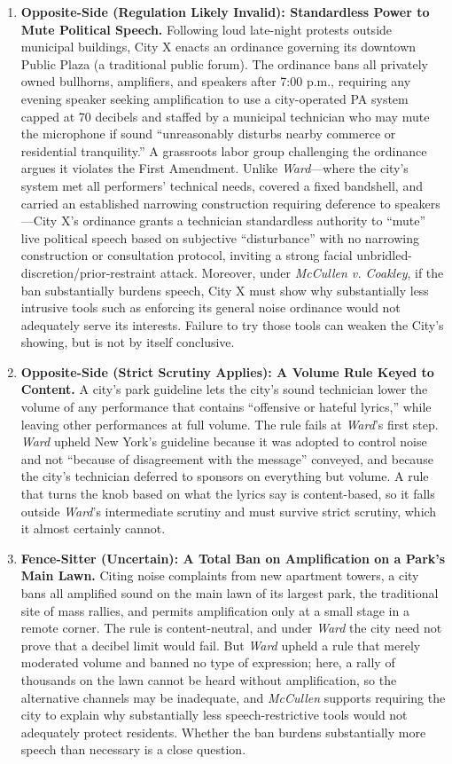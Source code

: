 \documentclass[12pt]{article}
\begin{document}
\begin{enumerate}
\item \textbf{Opposite-Side (Regulation Likely Invalid): Standardless Power to Mute Political Speech.} Following loud late-night protests outside municipal buildings, City X enacts an ordinance governing its downtown Public Plaza (a traditional public forum). The ordinance bans all privately owned bullhorns, amplifiers, and speakers after 7:00 p.m., requiring any evening speaker seeking amplification to use a city-operated PA system capped at 70 decibels and staffed by a municipal technician who may mute the microphone if sound ``unreasonably disturbs nearby commerce or residential tranquility.'' A grassroots labor group challenging the ordinance argues it violates the First Amendment. Unlike \textit{Ward}---where the city's system met all performers' technical needs, covered a fixed bandshell, and carried an established narrowing construction requiring deference to speakers---City X's ordinance grants a technician standardless authority to ``mute'' live political speech based on subjective ``disturbance'' with no narrowing construction or consultation protocol, inviting a strong facial unbridled-discretion/prior-restraint attack. Moreover, under \textit{McCullen v. Coakley}, if the ban substantially burdens speech, City X must show why substantially less intrusive tools such as enforcing its general noise ordinance would not adequately serve its interests. Failure to try those tools can weaken the City's showing, but is not by itself conclusive.

\item \textbf{Opposite-Side (Strict Scrutiny Applies): A Volume Rule Keyed to Content.} A city's park guideline lets the city's sound technician lower the volume of any performance that contains ``offensive or hateful lyrics,'' while leaving other performances at full volume. The rule fails at \textit{Ward}'s first step. \textit{Ward} upheld New York's guideline because it was adopted to control noise and not ``because of disagreement with the message'' conveyed, and because the city's technician deferred to sponsors on everything but volume. A rule that turns the knob based on what the lyrics say is content-based, so it falls outside \textit{Ward}'s intermediate scrutiny and must survive strict scrutiny, which it almost certainly cannot.

\item \textbf{Fence-Sitter (Uncertain): A Total Ban on Amplification on a Park's Main Lawn.} Citing noise complaints from new apartment towers, a city bans all amplified sound on the main lawn of its largest park, the traditional site of mass rallies, and permits amplification only at a small stage in a remote corner. The rule is content-neutral, and under \textit{Ward} the city need not prove that a decibel limit would fail. But \textit{Ward} upheld a rule that merely moderated volume and banned no type of expression; here, a rally of thousands on the lawn cannot be heard without amplification, so the alternative channels may be inadequate, and \textit{McCullen} supports requiring the city to explain why substantially less speech-restrictive tools would not adequately protect residents. Whether the ban burdens substantially more speech than necessary is a close question.


\end{enumerate}
\end{document}
